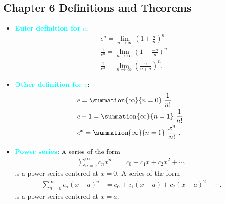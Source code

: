 \documentclass{report}
\begin{document}
\begin{itemize}
\end{itemize}

\pagebreak \bigbreak \noindent 
\subsection{Chapter 6 Definitions and Theorems}
\begin{itemize}
    \item \textbf{\textcolor{cyan}{Euler definition for $e$}}:
        \begin{align*}
                &e^{a} = \lim\limits_{n \to \infty}{\left(1+\frac{a}{n}\right)^{n}} \\
                &\frac{1}{e^{a}} = \lim\limits_{n \to \infty}{\left(1+\frac{-a}{n}\right)^{n}} \\ 
                &\frac{1}{e^{a}} = \lim\limits_{n \to \infty}{\left(\frac{n}{n+a}\right)^{n}}
            .\end{align*}
        \item \textbf{\textcolor{cyan}{Other definition for $e $}}:
            \begin{align*}
                &e = \summation{\infty}{n=0}\ \frac{1}{n!}\  \\
                &e-1 = \summation{\infty}{n=1}\ \frac{1}{n!}\ \\
                &e^{x} = \summation{\infty}{n=0}\ \frac{x^{n}}{n!}\ 
            .\end{align*}
        \item \textbf{\textcolor{cyan}{Power series}}:
            A series of the form
            \begin{align*}
                \sum_{n=0}^{\infty} c_n x^n &= c_0 + c_1 x + c_2 x^2 + \cdots 
            .\end{align*}
            is a power series centered at \( x = 0 \).
            \bigbreak \noindent 
            A series of the form
            \begin{align*}
                \sum_{n=0}^{\infty} c_n (x - a)^n &= c_0 + c_1 (x - a) + c_2 (x - a)^2 + \cdots 
            .\end{align*}
            is a power series centered at \( x = a \).


\end{itemize}
\end{document}

